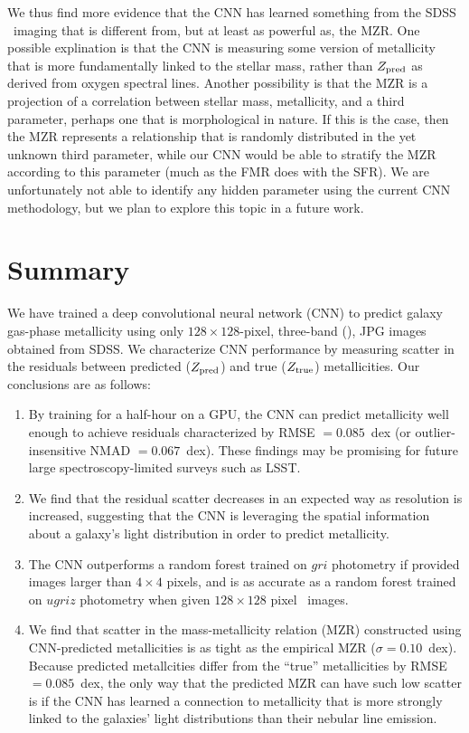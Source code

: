 \documentclass[fleqn,usenatbib]{mnras}
\begin{document}
We thus find more evidence that the CNN has learned something from the SDSS \sdssg\sdssr\sdssi\ imaging that is different from, but at least as powerful as, the MZR. One possible explination is that the CNN is measuring some version of metallicity that is more fundamentally linked to the stellar mass, rather than $Z_{\rm pred}$ as derived from oxygen spectral lines. Another possibility is that the MZR is a projection of a correlation between stellar mass, metallicity, and a third parameter, perhaps one that is morphological in nature. If this is the case, then the \cite{Tremonti2004} MZR represents a relationship that is randomly distributed in the yet unknown third parameter, while our CNN would be able to stratify the MZR according to this parameter (much as the FMR does with the SFR). We are unfortunately not able to identify any hidden parameter using the current CNN methodology, but we plan to explore this topic in a future work.

\section{Summary}\label{sec:summary}
We have trained a deep convolutional neural network (CNN) to predict galaxy gas-phase metallicity using only $128 \times 128$-pixel, three-band (\sdssg\sdssr\sdssi), JPG images obtained from SDSS. We characterize CNN performance by measuring scatter in the residuals between predicted ($Z_{\rm pred}$) and true ($Z_{\rm true}$) metallicities.
Our conclusions are as follows:

\begin{enumerate}
	\item By training for a half-hour on a GPU, the CNN can predict metallicity well enough to achieve residuals characterized by RMSE $= 0.085$~dex (or outlier-insensitive NMAD $= 0.067$~dex). These findings may be promising for future large spectroscopy-limited surveys such as LSST.

	\item We find that the residual scatter decreases in an expected way as resolution is increased, suggesting that the CNN is leveraging the spatial information about a galaxy's light distribution in order to predict metallicity.

	\item The CNN outperforms a random forest trained on $gri$ photometry if provided images larger than $4\times 4$ pixels, and is as accurate as a random forest trained on $ugriz$ photometry when given $128 \times 128$ pixel \sdssg\sdssr\sdssi\ images.

	\item We find that scatter in the mass-metallicity relation (MZR) constructed using CNN-predicted metallicities is as tight as the empirical MZR ($\sigma = 0.10$~dex).	Because predicted metallcities differ from the ``true'' metallicities by RMSE $= 0.085$~dex, the only way that the predicted MZR can have such low scatter is if the CNN has learned a connection to metallicity that is more strongly linked to the galaxies' light distributions than their nebular line emission.
\end{enumerate}
\end{document}
